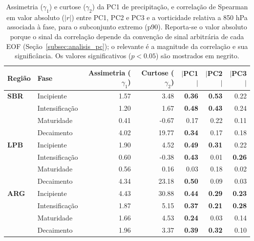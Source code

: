 \begin{table}[htbp]
\centering
\caption[Momentos estatísticos e correlação de PC1--PC3 de precipitação - Subconjunto p90]
{Assimetria ($\gamma_1$) e curtose ($\gamma_2$) da PC1 de precipitação, e correlação de Spearman em valor absoluto ($|r|$) entre PC1, PC2 e PC3 e a vorticidade relativa a 850 hPa associada à fase, para o subconjunto extremo (p90). Reporta-se o valor absoluto porque o sinal da correlação depende da convenção de sinal arbitrária de cada EOF (Seção~\ref{subsec:analisis_pc}); o relevante é a magnitude da correlação e sua significância. Os valores significativos ($p<0.05$) são mostrados em negrito.}
\label{tab:stat_p90_tp}
\begin{tabular*}{\textwidth}{@{\extracolsep{\fill}}llrrrrr}
\hline
\textbf{Região} & \textbf{Fase} & \textbf{Assimetria ($\gamma_1$)} & \textbf{Curtose ($\gamma_2$)} & \textbf{$|$PC1$|$} & \textbf{$|$PC2$|$} & \textbf{$|$PC3$|$} \\
\hline
\textbf{SBR} & Incipiente       & 1.57 & 3.48  & \textbf{0.36} & \textbf{0.53} & 0.22 \\
             & Intensificação & 1.20 & 1.67  & \textbf{0.48} & \textbf{0.43} & 0.24 \\
             & Maturidade         & 0.41 & -0.67 & 0.17 & 0.22 & 0.11 \\
             & Decaimento     & 4.02 & 19.77 & \textbf{0.34} & 0.17 & 0.18 \\
\hline
\textbf{LPB} & Incipiente       & 1.90 & 4.52  & \textbf{0.49} & \textbf{0.31} & 0.22 \\
             & Intensificação & 0.60 & -0.38 & \textbf{0.43} & 0.01 & \textbf{0.26} \\
             & Maturidade         & 0.56 & 0.16  & 0.03 & 0.18 & 0.02 \\
             & Decaimento     & 4.34 & 23.18 & \textbf{0.50} & 0.09 & 0.03 \\
\hline
\textbf{ARG} & Incipiente       & 4.43 & 30.88 & \textbf{0.44} & \textbf{0.29} & \textbf{0.23} \\
             & Intensificação & 1.87 & 5.15  & \textbf{0.37} & \textbf{0.21} & \textbf{0.28} \\
             & Maturidade         & 1.66 & 4.53  & \textbf{0.24} & 0.03 & 0.14 \\
             & Decaimento     & 1.96 & 3.37  & \textbf{0.39} & \textbf{0.32} & 0.10 \\
\hline
\end{tabular*}
\end{table}
